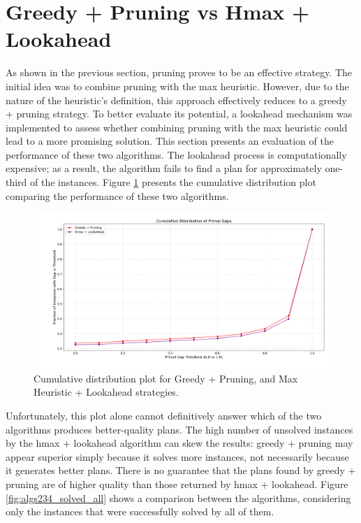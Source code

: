 \section{Greedy + Pruning vs Hmax + Lookahead}
As shown in the previous section, pruning proves to be an effective strategy.
The initial idea was to combine pruning with the max heuristic. However, due to the nature of the heuristic’s definition,
this approach effectively reduces to a greedy + pruning strategy. To better evaluate its potential,
a lookahead mechanism was implemented to assess whether combining pruning with the max heuristic could lead
to a more promising solution. This section presents an evaluation of the performance of these two algorithms.
The lookahead process is computationally expensive; as a result, the algorithm fails to find a plan for approximately
one-third of the instances. Figure \ref{fig:algs23} presents the cumulative distribution plot comparing the performance
of these two algorithms.

\begin{figure}[h!]
	\centering
	\includegraphics[width=\textwidth]{images/algs23.png}
	\caption{Cumulative distribution plot for Greedy + Pruning, and Max Heuristic + Lookahead strategies.}
	\label{fig:algs23}
\end{figure}

Unfortunately, this plot alone cannot definitively answer which of the two algorithms produces better-quality plans.
The high number of unsolved instances by the hmax + lookahead algorithm can skew the results: greedy + pruning may
appear superior simply because it solves more instances, not necessarily because it generates better plans.
There is no guarantee that the plans found by greedy + pruning are of higher quality than those returned by hmax + lookahead.
Figure \ref{fig:algs234_solved_all} shows a comparison between the algorithms, considering only the instances that were successfully
solved by all of them.

